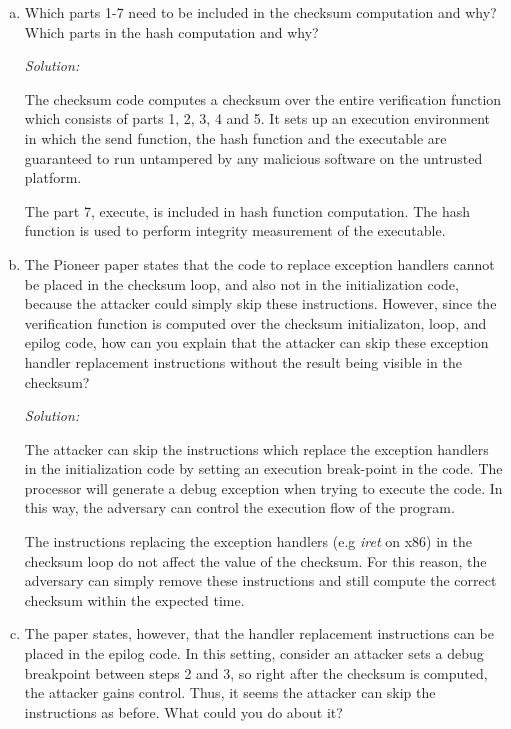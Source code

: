 \documentclass[a4paper,11pt]{article}
\newenvironment{solution}%
{\par{\noindent\small\textit{Solution:}}\vspace{-12pt}\begin{framed}}%
{\end{framed}\par}
\begin{document}
\begin{enumerate}[(a)]

\item Which parts 1-7 need to be included in the checksum computation and why?
Which parts in the hash computation and why?
\ifsolution\begin{solution}
The checksum code computes a checksum over the entire verification function 
which consists of parts 1, 2, 3, 4 and 5. It sets up an execution environment in which 
the send function, the hash function and the executable are guaranteed to run untampered 
by any malicious software on the untrusted platform.

The part 7, execute, is included in hash function computation. The hash function is
used to perform integrity measurement of the executable.  
\end{solution}\fi

\item The Pioneer paper states that the code to replace exception handlers
cannot be placed in the checksum loop, and also not in the initialization code,
because the attacker could simply skip these instructions. However, since the
verification function is computed over the checksum initializaton, loop, and
epilog code, how can you explain that the attacker can skip these exception
handler replacement instructions without the result being visible in the
checksum?

\ifsolution\begin{solution}
The attacker can skip the instructions which replace the exception handlers in the
initialization code by setting an execution break-point in the code. The processor
will generate a debug exception when trying to execute the code. In this way, the 
adversary can control the execution flow of the program.

The instructions replacing the exception handlers (e.g \emph{iret} on x86) in the checksum loop 
do not affect the value of the checksum. For this reason, the adversary can simply remove these
instructions and still compute the correct checksum within the expected time. 
\end{solution}\fi

\item The paper states, however, that the handler replacement instructions can
be placed in the epilog code. In this setting, consider an attacker sets a
debug breakpoint between steps 2 and 3, so right after the checksum is
computed, the attacker gains control. Thus, it seems the attacker can skip the
instructions as before.  What could you do about it?


\end{enumerate}
\end{document}
